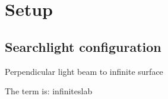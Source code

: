 \chapter{Setup}
\label{chapter:Setup}

\section{Searchlight configuration}
Perpendicular light beam to infinite surface \cite{Jacques1995}

The term is: \gls{infiniteslab} 
